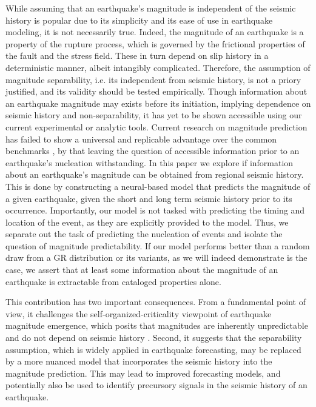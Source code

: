 \documentclass[pdflatex]{sn-jnl}
\begin{document}
While assuming that an earthquake's magnitude is independent of the seismic history is popular due to its simplicity and its ease of use in earthquake modeling, it is not necessarily true. Indeed, the magnitude of an earthquake is a property of the rupture process, which is governed by the frictional properties of the fault and the stress field. These in turn depend on slip history in a deterministic manner, albeit intangibly complicated. Therefore, the assumption of magnitude separability, i.e. its independent from seismic history, is not a priory justified, and its validity should be tested empirically.
Though information about an earthquake magnitude may exists before its initiation, implying dependence on seismic history and non-separability, it has yet to be shown accessible using our current experimental or analytic tools. Current research on magnitude prediction has failed to show a universal and replicable advantage over the common benchmarks \cite{shcherbakov_forecasting_2019, ogata_exploring_2018, stockman_forecasting_2023,  panakkat_neural_2007}, by that leaving the question of accessible information prior to an earthquake's nucleation withstanding. 
\newline
In this paper we explore if information about an earthquake's magnitude can be obtained from regional seismic history. This is done by constructing a neural-based model that predicts the magnitude of a given earthquake, given the short and long term seismic history prior to its occurrence. Importantly, our model is not tasked with predicting the timing and location of the event, as they are explicitly provided to the model. Thus, we separate out the task of predicting the nucleation of events and isolate the question of magnitude predictability. If our model performs better than a random draw from a GR distribution or its variants, as we will indeed demonstrate is the case, we assert that at least some information about the magnitude of an earthquake is extractable from cataloged properties alone. 


This contribution has two important consequences. From a fundamental point of view, it challenges the self-organized-criticality viewpoint of earthquake magnitude emergence, which posits that magnitudes are inherently unpredictable and do not depend on seismic history \cite{olami_self-organized_1992, sornette_self-organized_1989, bak_earthquakes_1989, de_geus_scaling_2022}. Second, it suggests that the separability assumption, which is widely applied in earthquake forecasting, may be replaced by a more nuanced model that incorporates the seismic history into the magnitude prediction. This may lead to improved forecasting models, and potentially also be used to identify precursory signals in the seismic history of an earthquake.
\end{document}
